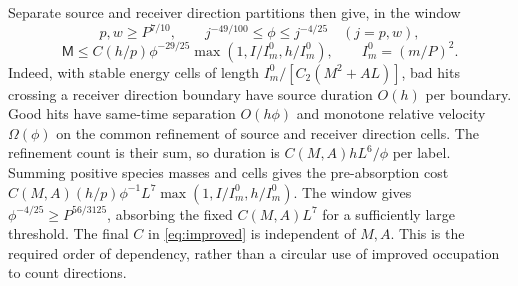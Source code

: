 \documentclass[11pt]{article}
\theoremstyle{remark}\newtheorem{remark}[theorem]{Remark}
\numberwithin{equation}{section}
\begin{document}
Separate source and receiver direction partitions then give, in the window
\begin{equation}\label{eq:window}
 p,w\ge P^{7/10},\qquad
 j^{-49/100}\le\phi\le j^{-4/25}\quad(j=p,w),
\end{equation}
\begin{equation}\label{eq:improved}
 \mathsf M\le C(h/p)\phi^{-29/25}
     \max(1,I/I_m^0,h/I_m^0),\qquad I_m^0=(m/P)^2.
\end{equation}
Indeed, with stable energy cells of length
$I_m^0/[C_2(M^2+AL)]$, bad hits crossing a receiver direction boundary
have source duration $O(h)$ per boundary. Good hits have same-time
separation $O(h\phi)$ and monotone relative velocity $\Omega(\phi)$ on
the common refinement of source and receiver direction cells. The refinement
count is their sum, so duration is $C(M,A)hL^6/\phi$ per label.
Summing positive species masses and cells gives the pre-absorption cost
$C(M,A)(h/p)\phi^{-1}L^7\max(1,I/I_m^0,h/I_m^0)$.
The window gives $\phi^{-4/25}\ge P^{56/3125}$, absorbing the fixed
$C(M,A)L^7$ for a sufficiently large threshold. The final $C$ in
\eqref{eq:improved} is independent of $M,A$. This is the required order
of dependency, rather than a circular use of improved occupation to count
directions.
\end{document}
